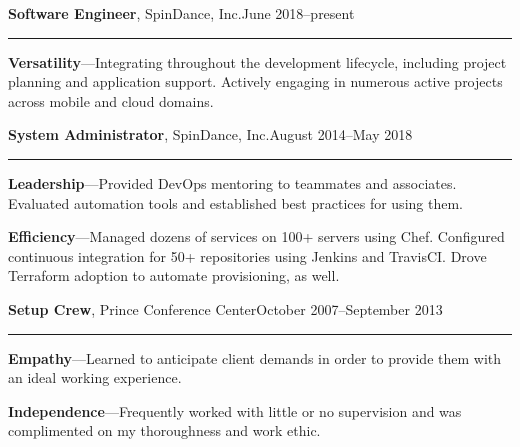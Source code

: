 \documentclass[11pt]{article}
\newenvironment{resblock}[1]
  {\noindent{\Large\textbf{#1}}}
  {\par\vspace{1em}}
\begin{document}
\begin{resblock}{Work Experience}
\vspace{0.6em}

  \textbf{Software Engineer}, SpinDance, Inc.\hfill June 2018--present\strut\hrule
  \begin{changemargin}{3em}{0em}
    \textbf{Versatility}---Integrating throughout the development lifecycle, including project planning and application support. Actively engaging in numerous active projects across mobile and cloud domains. 
      \end{changemargin}

  \textbf{System Administrator}, SpinDance, Inc.\hfill August 2014--May 2018\strut\hrule
  \begin{changemargin}{3em}{0em}
    \textbf{Leadership}---Provided DevOps mentoring to teammates and associates. Evaluated automation tools and established best practices for using them.

    \textbf{Efficiency}---Managed dozens of services on 100+ servers using Chef. Configured continuous integration for 50+ repositories using Jenkins and TravisCI. Drove Terraform adoption to automate provisioning, as well.
    
  \end{changemargin}

  \textbf{Setup Crew}, Prince Conference Center\hfill October 2007--September 2013\strut\hrule
  \begin{changemargin}{3em}{0em}
%
    \textbf{Empathy}---Learned to anticipate client demands in order to provide them with an ideal working experience.

    \textbf{Independence}---Frequently worked with little or no supervision and was complimented on my thoroughness and work ethic.
  \end{changemargin}
\end{resblock}
\end{document}
